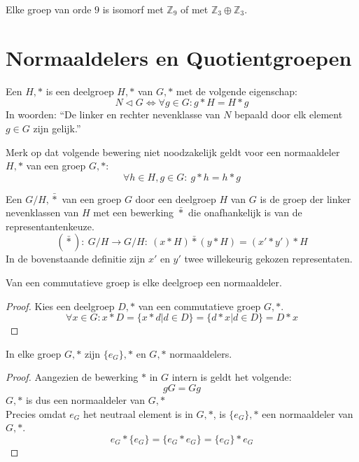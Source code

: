 \documentclass[main.tex]{subfiles}
\begin{document}
\begin{st}
  Elke groep van orde $9$ is isomorf met $\mathbb{Z}_{9}$ of met $\mathbb{Z}_{3} \oplus \mathbb{Z}_{3}$.
  
\end{st}

\section{Normaaldelers en Quotientgroepen}
\label{sec:normaaldelers-en-quotientgroepen}

\begin{de}
  Een  $H,*$ is een deelgroep $H,*$ van $G,*$ met de volgende eigenschap:
  \[ N \triangleleft G \Leftrightarrow \forall g \in G: g*H = H*g \]
  In woorden: ``De linker en rechter nevenklasse van $N$ bepaald door elk element $g\in G$ zijn gelijk.''
\end{de}

\begin{opm}
  Merk op dat volgende bewering niet noodzakelijk geldt voor een normaaldeler $H,*$ van een groep $G,*$:
  \[ \forall h \in H, g \in G:\ g*h = h*g \]
\end{opm}

\begin{de}
  Een  $G/H,\bar{*}$ van een groep $G$ door een deelgroep $H$ van $G$ is de groep der linker nevenklassen van $H$ met een bewerking $\bar{*}$ die onafhankelijk is van de representantenkeuze.
  \[ (\bar{*}):\ G/H \rightarrow G/H:\ (x*H)\bar{*}(y*H) = (x' * y') * H \]
  In de bovenstaande definitie zijn $x'$ en $y'$ twee willekeurig gekozen representaten.
\end{de}

\begin{st}
  Van een commutatieve groep is elke deelgroep een normaaldeler.

  \begin{proof}
    Kies een deelgroep $D,*$ van een commutatieve groep $G,*$.
    \[ \forall x\in G: x*D = \{ x*d | d \in D \} = \{ d*x | d \in D \} = D*x \]
  \end{proof}
\end{st}

\begin{st}
  In elke groep $G,*$ zijn $\{e_{G}\},*$ en $G,*$ normaaldelers.
  
  \begin{proof}
    Aangezien de bewerking $*$ in $G$ intern is geldt het volgende:
    \[ gG = Gg \]
    $G,*$ is dus een normaaldeler van $G,*$\\
    Precies omdat $e_{G}$ het neutraal element is in $G,*$, is $\{e_{G}\},*$ een normaaldeler van $G,*$.
    \[ e_G*\{e_{G}\} = \{e_{G} * e_{G}\} = \{e_{G}\}*e_{G} \]
  \end{proof}
\end{st}
\end{document}

